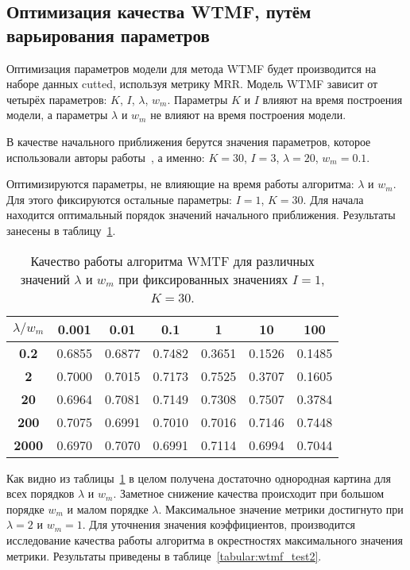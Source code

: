 \subsection{Оптимизация качества WTMF, путём варьирования параметров}
    Оптимизация параметров модели для метода WTMF будет производится на наборе данных cutted, используя метрику МRR.
    Модель WTMF зависит от четырёх параметров: $K$, $I$, $\lambda$, $w_m$.
    Параметры $K$ и $I$ влияют на время построения модели, а параметры $\lambda$ и $w_m$ не влияют на время построения модели.

    В качестве начального приближения берутся значения параметров, которое использовали авторы работы~\cite{linking_base}, а именно:
    $K=30$, $I=3$, $\lambda=20$, $w_m=0.1$.

    Оптимизируются параметры, не влияющие на время работы алгоритма: $\lambda$ и $w_m$.
    Для этого фиксируются остальные параметры: $I=1$, $K=30$.
    Для начала находится оптимальный порядок значений начального приближения. Результаты занесены в таблицу~\ref{tabular:wtmf_test1}.

    \begin{table}[ht!]
        \caption{Качество работы алгоритма WMTF для различных значений $\lambda$ и $w_m$ при фиксированных значениях $I=1$, $K=30$. \bigskip}
        \centering

        \label{tabular:wtmf_test1}
        \begin{tabular}{|c|c|c|c|c|c|c|} \hline
            $\lambda/w_m$ & \bf{0.001} & \bf{0.01} & \bf{0.1} & \bf{1} & \bf{10} & \bf{100} \\ \hline
            \bf{0.2} & 0.6855 & 0.6877 & 0.7482 & 0.3651 & 0.1526 & 0.1485 \\ \hline
            \bf{2} & 0.7000 & 0.7015 & 0.7173 & 0.7525 & 0.3707 & 0.1605 \\ \hline
            \bf{20} & 0.6964 & 0.7081 & 0.7149 & 0.7308 & 0.7507 & 0.3784 \\ \hline
            \bf{200} & 0.7075 & 0.6991 & 0.7010 & 0.7016 & 0.7146 & 0.7448 \\ \hline
            \bf{2000} & 0.6970 & 0.7070 & 0.6991 & 0.7114 & 0.6994 & 0.7044 \\ \hline
        \end{tabular}
    \end{table}
    Как видно из таблицы~\ref{tabular:wtmf_test1} в целом получена достаточно однородная картина для всех порядков $\lambda$ и $w_m$.
    Заметное снижение качества происходит при большом порядке $w_m$ и малом порядке $\lambda$.
    Максимальное значение метрики достигнуто при $\lambda=2$ и $w_m=1$.
    Для уточнения значения коэффициентов, производится исследование качества работы алгоритма в окрестностях максимального значения метрики.
    Результаты приведены в таблице~\ref{tabular:wtmf_test2}.

